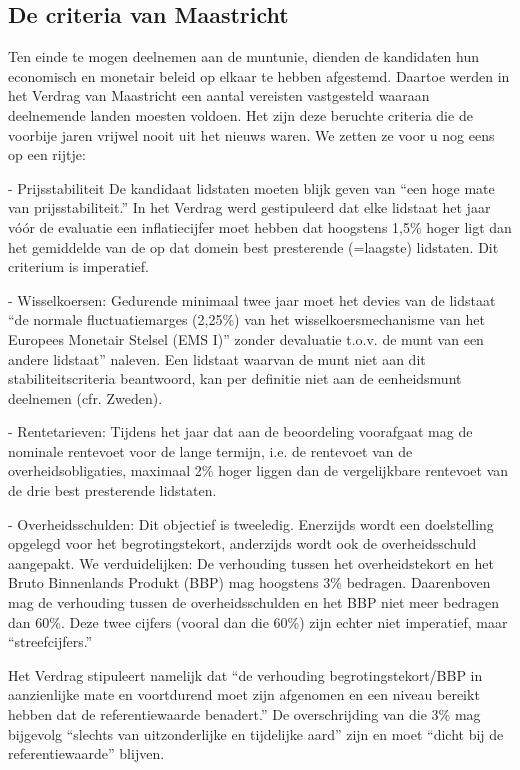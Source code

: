 \documentclass[a4paper]{article}
\begin{document}
\subsection{De criteria van Maastricht}

Ten einde te mogen deelnemen aan de muntunie, dienden de kandidaten
hun economisch en monetair beleid op elkaar te hebben afgestemd.
Daartoe werden in het Verdrag van Maastricht een aantal vereisten
vastgesteld waaraan deelnemende landen moesten voldoen. Het zijn
deze beruchte criteria die de voorbije jaren vrijwel nooit uit het
nieuws waren. We zetten ze voor u nog eens op een rijtje:


- Prijsstabiliteit De kandidaat lidstaten moeten blijk geven van
``een hoge mate van prijsstabiliteit.'' In het Verdrag werd
gestipuleerd dat elke lidstaat het jaar vóór de evaluatie een
inflatiecijfer moet hebben dat hoogstens 1,5\% hoger ligt dan het
gemiddelde van de op dat domein best presterende (=laagste)
lidstaten. Dit criterium is imperatief.

- Wisselkoersen: Gedurende minimaal twee jaar moet het devies van de
lidstaat ``de normale fluctuatiemarges (2,25\%) van het
wisselkoersmechanisme van het Europees Monetair Stelsel (EMS I)''
zonder devaluatie t.o.v. de munt van een andere lidstaat'' naleven.
Een lidstaat waarvan de munt niet aan dit stabiliteitscriteria
beantwoord, kan per definitie niet aan de eenheidsmunt deelnemen
(cfr. Zweden).

- Rentetarieven: Tijdens het jaar dat aan de beoordeling voorafgaat
mag de nominale rentevoet voor de lange termijn, i.e. de rentevoet
van de overheidsobligaties, maximaal 2\% hoger liggen dan de
vergelijkbare rentevoet van de drie best presterende lidstaten.

- Overheidsschulden: Dit objectief is tweeledig. Enerzijds wordt een
doelstelling opgelegd voor het begrotingstekort, anderzijds wordt
ook de overheidsschuld aangepakt. We verduidelijken: De verhouding
tussen het overheidstekort en het Bruto Binnenlands Produkt (BBP)
mag hoogstens 3\% bedragen. Daarenboven mag de verhouding tussen de
overheidsschulden en het BBP niet meer bedragen dan 60\%. Deze twee
cijfers (vooral dan die 60\%) zijn echter niet imperatief, maar
``streefcijfers.''

Het Verdrag stipuleert namelijk dat ``de verhouding
begrotingstekort/BBP in aanzienlijke mate en voortdurend moet zijn
afgenomen en een niveau bereikt hebben dat de referentiewaarde
benadert.'' De overschrijding van die 3\% mag bijgevolg ``slechts
van uitzonderlijke en tijdelijke aard'' zijn en moet ``dicht bij de
referentiewaarde'' blijven.
\end{document}
